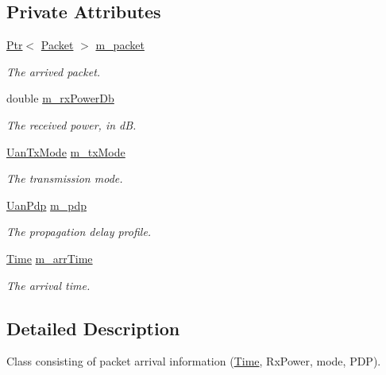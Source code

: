 \subsection*{Private Attributes}
\begin{DoxyCompactItemize}
\item 
\hyperlink{classns3_1_1Ptr}{Ptr}$<$ \hyperlink{classns3_1_1Packet}{Packet} $>$ \hyperlink{classns3_1_1UanPacketArrival_a045efcea8acaa58e8b08c38aa1e71dd2}{m\+\_\+packet}
\begin{DoxyCompactList}\small\item\em The arrived packet. \end{DoxyCompactList}\item 
double \hyperlink{classns3_1_1UanPacketArrival_a67a4f3655888fc634e1b2055e26d9561}{m\+\_\+rx\+Power\+Db}
\begin{DoxyCompactList}\small\item\em The received power, in dB. \end{DoxyCompactList}\item 
\hyperlink{classns3_1_1UanTxMode}{Uan\+Tx\+Mode} \hyperlink{classns3_1_1UanPacketArrival_aaab018dcef6c009ebfbf2e8c0a86bf29}{m\+\_\+tx\+Mode}
\begin{DoxyCompactList}\small\item\em The transmission mode. \end{DoxyCompactList}\item 
\hyperlink{classns3_1_1UanPdp}{Uan\+Pdp} \hyperlink{classns3_1_1UanPacketArrival_a1fb86712c5f053734a53143b9eda8267}{m\+\_\+pdp}
\begin{DoxyCompactList}\small\item\em The propagation delay profile. \end{DoxyCompactList}\item 
\hyperlink{classns3_1_1Time}{Time} \hyperlink{classns3_1_1UanPacketArrival_aa3e91335cc33e7ae6017933e707917ac}{m\+\_\+arr\+Time}
\begin{DoxyCompactList}\small\item\em The arrival time. \end{DoxyCompactList}\end{DoxyCompactItemize}


\subsection{Detailed Description}
Class consisting of packet arrival information (\hyperlink{classns3_1_1Time}{Time}, Rx\+Power, mode, P\+DP). 

